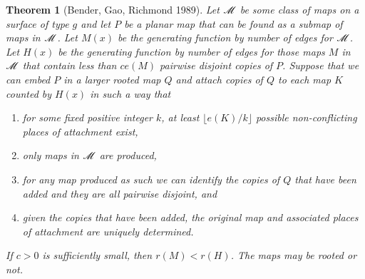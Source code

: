 \documentclass[amsmath,longbibliography,secnumarabic,floatfix,amssymb,nofootinbib,nobibnotes,letterpaper,11pt,notitlepage,preprint]{revtex4-1}
\newtheorem{theorem}{Theorem} \newtheorem{corollary}[theorem]{Corollary}
\begin{document}
\begin{theorem}[Bender, Gao, Richmond 1989] Let $\mathscr{M}$ be some class of maps on a surface of
  type $g$ and let $P$ be a planar map that can be found as a submap of maps in $\mathscr{M}$. Let
  $M(x)$ be the generating function by number of edges for $\mathscr{M}$. Let $H(x)$ be the generating
  function by number of edges for those maps $M$ in $\mathscr{M}$ that contain less than $ce(M)$
  pairwise disjoint copies of $P$. Suppose that we can embed $P$ in a larger rooted map $Q$ and
  attach copies of $Q$ to each map $K$ counted by $H(x)$ in such a way that
  \begin{enumerate}
  \item for some fixed positive integer $k$, at least $\lfloor e(K)/k \rfloor$ possible
    non-conflicting places of attachment exist,
  \item only maps in $\mathscr{M}$ are produced,
  \item for any map produced as such we can identify the copies of $Q$ that have been added and they
    are all pairwise disjoint, and
  \item given the copies that have been added, the original map and associated places of attachment
    are uniquely determined.
  \end{enumerate} If $c > 0$ is sufficiently small, then $r(M) < r(H)$. The maps may be rooted or
  not.
\end{theorem}
\end{document}
